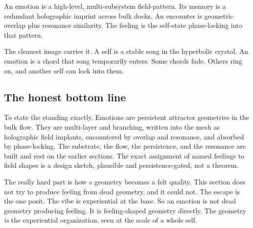 \begin{result}
An emotion is a high-level, multi-subsystem field-pattern. Its memory is a redundant holographic imprint across bulk docks. An encounter is geometric overlap plus resonance similarity. The feeling is the self-state phase-locking into that pattern.
\end{result}

The cleanest image carries it. A self is a stable song in the hyperbolic crystal. An emotion is a chord that song temporarily enters. Some chords fade. Others ring on, and another self can lock into them.

\subsection{The honest bottom line}

To state the standing exactly. Emotions are persistent attractor geometries in the bulk flow. They are multi-layer and branching, written into the mesh as holographic field implants, encountered by overlap and resonance, and absorbed by phase-locking. The substrate, the flow, the persistence, and the resonance are built and rest on the earlier sections. The exact assignment of named feelings to field shapes is a design sketch, plausible and persistence-gated, not a theorem.

The really hard part is how a geometry becomes a felt quality. This section does not try to produce feeling from dead geometry, and it could not. The escape is the one posit. The vibe is experiential at the base. So an emotion is not dead geometry producing feeling. It is feeling-shaped geometry directly. The geometry \emph{is} the experiential organization, seen at the scale of a whole self.
